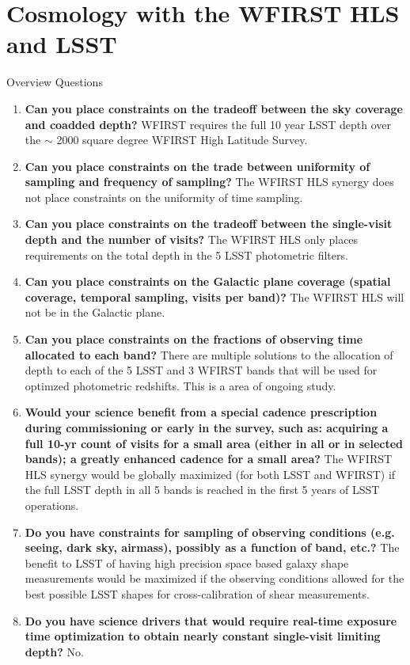 %
%
%
%

\section{Cosmology with the WFIRST HLS and LSST}
\def\secname{\chpname:weaklensing}\label{sec:\secname}



Overview Questions  %


\begin{enumerate}
\item \textbf{Can you place constraints on the tradeoff between the sky coverage and coadded depth?}
WFIRST requires the full 10 year LSST depth over the $\sim$ 2000 square degree WFIRST High Latitude Survey.
\item \textbf{Can you place constraints on the trade between uniformity of sampling and frequency of
sampling?} The WFIRST HLS synergy does not place constraints on the uniformity of time sampling.
\item \textbf{Can you place constraints on the tradeoff between the single-visit depth and the number
of visits?} The WFIRST HLS only places requirements on the total depth in the 5 LSST photometric filters.
\item \textbf{Can you place constraints on the Galactic plane coverage (spatial coverage, temporal
sampling, visits per band)?} The WFIRST HLS will not be in the Galactic plane.
\item \textbf{Can you place constraints on the fractions of observing time allocated to each band?}
There are multiple solutions to the allocation of depth to each of the 5 LSST and 3 WFIRST bands that will be used for optimzed photometric redshifts. This is a area of ongoing study.  
\item\textbf{ Would your science benefit from a special cadence prescription during commissioning or
early in the survey, such as: acquiring a full 10-yr count of visits for a small area (either in all or in selected bands); a greatly enhanced cadence for a small area?}
The WFIRST HLS synergy would be globally maximized (for both LSST and WFIRST) if the full LSST depth in all 5 bands is reached in the first 5 years of LSST operations.
\item \textbf{Do you have constraints for sampling of observing conditions (e.g. seeing, dark sky,
airmass), possibly as a function of band, etc.?}
The benefit to LSST of having high precision space based galaxy shape measurements would be maximized if the observing conditions allowed for the best possible LSST shapes for cross-calibration of shear measurements.
\item \textbf{Do you have science drivers that would require real-time exposure time optimization
to obtain nearly constant single-visit limiting depth?}
No.
\end{enumerate}

